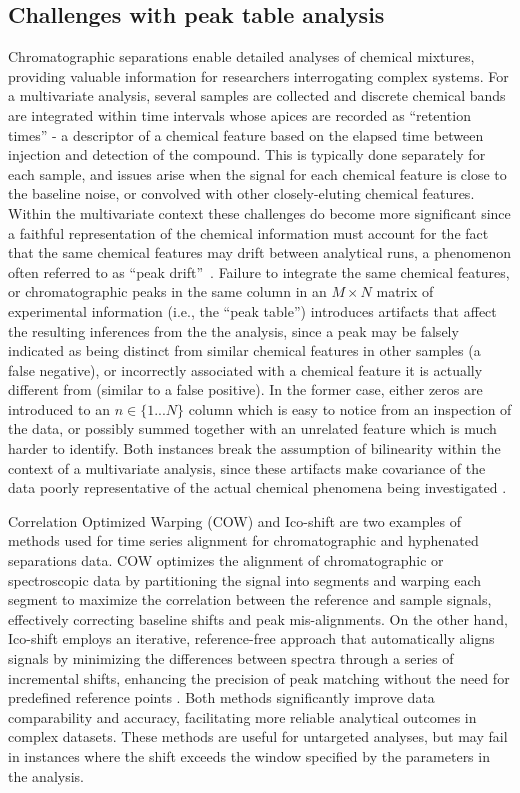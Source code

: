 \documentclass[preprint,12pt]{elsarticle}
\begin{document}
\subsection{Challenges with peak table analysis}
Chromatographic separations enable detailed analyses of chemical mixtures, providing valuable information for researchers interrogating complex systems. For a multivariate analysis, several samples are collected and discrete chemical bands are integrated within time intervals whose apices are recorded as ``retention times'' - a descriptor of a chemical feature based on the elapsed time between injection and detection of the compound. This is typically done separately for each sample, and issues arise when the signal for each chemical feature is close to the baseline noise, or convolved with other closely-eluting chemical features. Within the multivariate context these challenges do become more significant since a faithful representation of the chemical information must account for the fact that the same chemical features may drift between analytical runs, a phenomenon often referred to as ``peak drift''~\cite{christensen2005chromatographic}. Failure to integrate the same chemical features, or chromatographic peaks in the same column in an $M \times N$ matrix of experimental information (i.e., the ``peak table'') introduces artifacts that affect the resulting inferences from the the analysis, since a peak may be falsely indicated as being distinct from similar chemical features in other samples (a false negative), or incorrectly associated with a chemical feature it is actually different from (similar to a false positive). In the former case, either zeros are introduced to an $n \in \{1...N\}$ column which is easy to notice from an inspection of the data, or possibly summed together with an unrelated feature which is much harder to identify. Both instances break the assumption of bilinearity within the context of a multivariate analysis, since these artifacts make covariance of the data poorly representative of the actual chemical phenomena being investigated \cite{armstrong2023parafac2,de2012integration}. 

Correlation Optimized Warping (COW) \cite{tomasi2004correlation} and Ico-shift are two examples of methods used for time series alignment for chromatographic and hyphenated separations data. COW optimizes the alignment of chromatographic or spectroscopic data by partitioning the signal into segments and warping each segment to maximize the correlation between the reference and sample signals, effectively correcting baseline shifts and peak mis-alignments. On the other hand, Ico-shift employs an iterative, reference-free approach that automatically aligns signals by minimizing the differences between spectra through a series of incremental shifts, enhancing the precision of peak matching without the need for predefined reference points \cite{savorani2010icoshift}. Both methods significantly improve data comparability and accuracy, facilitating more reliable analytical outcomes in complex datasets. These methods are useful for untargeted analyses, but may fail in instances where the shift exceeds the window specified by the parameters in the analysis. 
\end{document}
